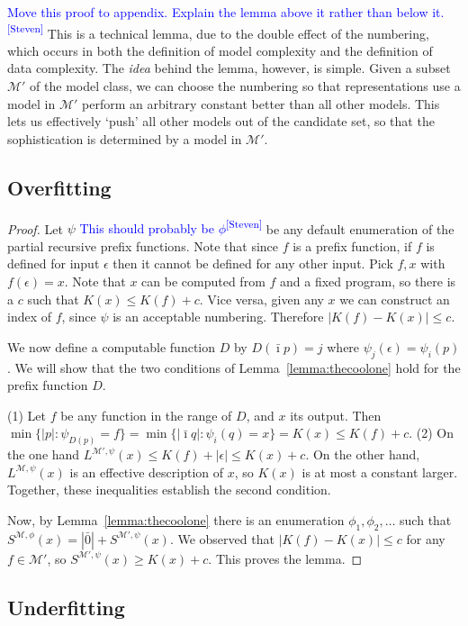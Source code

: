 \documentclass{style/llncs}
\newcommand{\M}{\mathscr M}
\newcommand{\sdr}[1]{\textcolor{blue}{\small #1\textsuperscript{[Steven]} }}
\begin{document}
\sdr{Move this proof to appendix. Explain the lemma above it rather than below it.}
This is a technical lemma, due to the double effect of the numbering, which occurs in both the definition of model complexity and the definition of data complexity. The \emph{idea} behind the lemma, however, is simple. Given a subset $\M'$ of the model class, we can choose the numbering so that representations use a model in $\M'$ perform an arbitrary constant better than all other models. This lets us effectively `push' all other models out of the candidate set, so that the sophistication is determined by a model in $\M'$.

\subsection{Overfitting}

\overfitting*

\begin{proof}
Let $\psi$ \sdr{This should probably be $\phi$} be any default enumeration of the partial recursive prefix functions. Note that since $f$ is a prefix function, if $f$ is defined for input $\epsilon$ then it cannot be defined for any other input. Pick $f,x$ with $f(\epsilon)=x$. Note that $x$ can be computed from $f$ and a fixed program, so there is a $c$ such that $K(x)\le K(f)+c$. Vice versa, given any $x$ we can construct an index of $f$, since $\psi$ is an acceptable numbering. Therefore $|K(f)-K(x)|\le c$.

We now define a computable function $D$ by $D(\bar\imath p)=j$ where $\psi_j(\epsilon) = \psi_i(p)$.  We will show that the two conditions of Lemma~\ref{lemma:thecoolone} hold for the prefix function $D$.

(1) Let $f$ be any function in the range of $D$, and $x$ its output. Then $\min\{|p|:\psi_{D(p)}=f\}=\min\{|\bar\imath q|:\psi_i(q)=x\}=K(x)\le K(f)+c$. (2) On the one hand $L^{\M',\psi}(x)\le K(f)+|\epsilon|\le K(x)+c$. On the other hand, $L^{\M,\psi}(x)$ is an effective description of $x$, so $K(x)$ is at most a constant larger. Together, these inequalities establish the second condition.

Now, by Lemma~\ref{lemma:thecoolone} there is an enumeration $\phi_1,\phi_2,\ldots$ such that $S^{\M,\phi}(x)=|\bar 0|+S^{\M',\psi}(x)$. We observed that $|K(f)-K(x)|\le c$ for any $f\in\M'$, so $S^{\M',\psi}(x)\ge K(x)+c$. This proves the lemma.
\end{proof}
\subsection{Underfitting}
\end{document}
